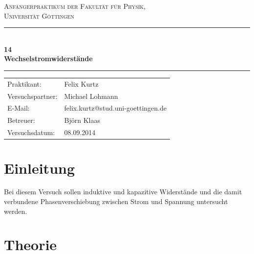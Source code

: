\documentclass[12pt,a4paper,titlepage,headinclude,bibtotoc]{scrartcl}
\begin{document}
\begin{titlepage}
\centering
\textsc{\Large Anfängerpraktikum der Fakultät für
  Physik,\\[1.5ex] Universität Göttingen}

\vspace*{4.2cm}

\rule{\textwidth}{1pt}\\[0.5cm]
{\huge \bfseries
  14\\[1.5ex]
  Wechselstromwiderstände}\\[0.5cm]
\rule{\textwidth}{1pt}

\vspace*{2.5cm}

\begin{Large}
\begin{tabular}{ll}
Praktikant: & Felix Kurtz\\
Versuchspartner: & Michael Lohmann\\
 E-Mail: &  felix.kurtz@stud.uni-goettingen.de\\
 Betreuer: & Björn Klaas\\
 Versuchsdatum: & 08.09.2014\\
\end{tabular}
\end{Large}

\vspace*{0.8cm}

\begin{Large}
\end{Large}

\end{titlepage}

\tableofcontents

\newpage

\section{Einleitung}
\label{sec:einleitung}
Bei diesem Versuch sollen induktive und kapazitive Widerstände und die damit verbundene Phasenverschiebung zwischen Strom und Spannung untersucht werden.

\section{Theorie}
\label{sec:theorie}
\end{document}

